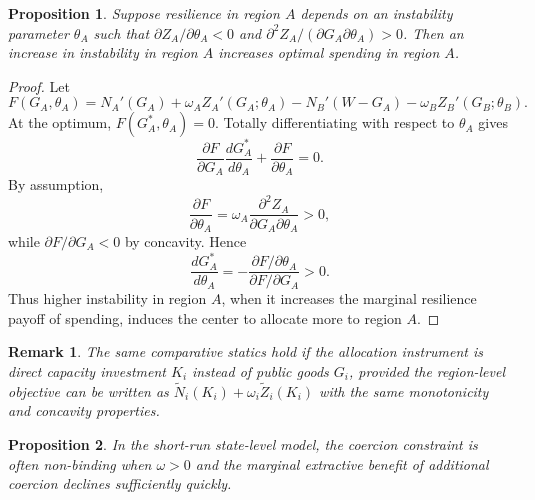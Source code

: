 \documentclass[12pt]{article}
\newtheorem{proposition}{Proposition}
\newtheorem*{remark}{Remark}
\begin{document}
\begin{proposition}
Suppose resilience in region $A$ depends on an instability parameter $\theta_A$ such that $\partial Z_A/\partial \theta_A < 0$ and $\partial^2 Z_A/(\partial G_A\partial \theta_A) > 0$. Then an increase in instability in region $A$ increases optimal spending in region $A$.
\end{proposition}

\begin{proof}
Let
\begin{equation}
F(G_A,\theta_A) = N_A'(G_A) + \omega_A Z_A'(G_A;\theta_A) - N_B'(W-G_A) - \omega_B Z_B'(G_B;\theta_B).
\end{equation}
At the optimum, $F(G_A^*,\theta_A)=0$. Totally differentiating with respect to $\theta_A$ gives
\begin{equation}
\frac{\partial F}{\partial G_A}\frac{dG_A^*}{d\theta_A} + \frac{\partial F}{\partial \theta_A} = 0.
\end{equation}
By assumption,
\begin{equation}
\frac{\partial F}{\partial \theta_A} = \omega_A \frac{\partial^2 Z_A}{\partial G_A\partial \theta_A} > 0,
\end{equation}
while $\partial F/\partial G_A < 0$ by concavity. Hence
\begin{equation}
\frac{dG_A^*}{d\theta_A} = -\frac{\partial F/\partial \theta_A}{\partial F/\partial G_A} > 0.
\end{equation}
Thus higher instability in region $A$, when it increases the marginal resilience payoff of spending, induces the center to allocate more to region $A$.\qedhere
\end{proof}

\begin{remark}
The same comparative statics hold if the allocation instrument is direct capacity investment $K_i$ instead of public goods $G_i$, provided the region-level objective can be written as $\tilde N_i(K_i) + \omega_i \tilde Z_i(K_i)$ with the same monotonicity and concavity properties.
\end{remark}

\begin{proposition}
In the short-run state-level model, the coercion constraint is often non-binding when $\omega>0$ and the marginal extractive benefit of additional coercion declines sufficiently quickly.
\end{proposition}
\end{document}
